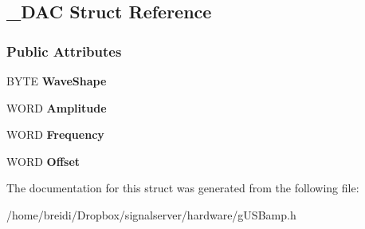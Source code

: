 \hypertarget{struct___d_a_c}{
\subsection{\_\-DAC Struct Reference}
\label{struct___d_a_c}
}
\subsubsection*{Public Attributes}
\begin{DoxyCompactItemize}
\item 
\hypertarget{struct___d_a_c_a02dfb58777d0a55f7b2c33d14ba11289}{
BYTE {\bfseries WaveShape}}
\label{struct___d_a_c_a02dfb58777d0a55f7b2c33d14ba11289}

\item 
\hypertarget{struct___d_a_c_a5f94b42475d94a3097399d5e8595ade0}{
WORD {\bfseries Amplitude}}
\label{struct___d_a_c_a5f94b42475d94a3097399d5e8595ade0}

\item 
\hypertarget{struct___d_a_c_a478c53d6ba57ed19e4021d7e52a2a05a}{
WORD {\bfseries Frequency}}
\label{struct___d_a_c_a478c53d6ba57ed19e4021d7e52a2a05a}

\item 
\hypertarget{struct___d_a_c_a7153a5582845893f66a03f261bbd76bc}{
WORD {\bfseries Offset}}
\label{struct___d_a_c_a7153a5582845893f66a03f261bbd76bc}

\end{DoxyCompactItemize}


The documentation for this struct was generated from the following file:\begin{DoxyCompactItemize}
\item 
/home/breidi/Dropbox/signalserver/hardware/gUSBamp.h\end{DoxyCompactItemize}
